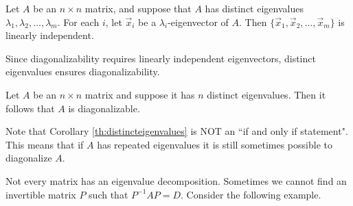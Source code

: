 \documentclass{ximera}
\begin{document}
  \begin{theorem}\label{th:linindepeigenvectors}
  Let $A$ be an $n\times n$ matrix, and suppose that $A$
  has distinct eigenvalues $\lambda_1, \lambda_2, \ldots, \lambda_m$.
  For each $i$, let $\vec{x}_i$ be a $\lambda_i$-eigenvector of $A$.
  Then $\{ \vec{x}_1, \vec{x}_2, \ldots, \vec{x}_m\}$ is
  linearly independent.
  \end{theorem}
   
  Since diagonalizability requires linearly independent eigenvectors, distinct eigenvalues ensures diagonalizability.
   
  \begin{corollary}\label{th:distincteigenvalues}
  Let $A$ be an $n \times n$ matrix and suppose it has $n$ distinct eigenvalues. Then it follows that $A$ is diagonalizable.
  \end{corollary}
   
  \begin{remark}
      Note that Corollary \ref{th:distincteigenvalues} is NOT an ``if and only if statement".  This means that if $A$ has repeated eigenvalues it is still sometimes possible to diagonalize $A$.
  \end{remark}
   
  Not every matrix has an eigenvalue decomposition. Sometimes we cannot find an invertible matrix $P$ such that $P^{-1}AP=D$.  Consider the following example.
   
\end{document}
